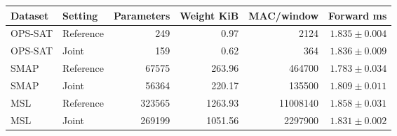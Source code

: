 \begin{tabular}{@{}llrrrr@{}}
\toprule
Dataset & Setting & Parameters & Weight KiB & MAC/window & Forward ms \\
\midrule
\acs{OPS-SAT} & Reference & \num{249} & \num{0.97} & \num{2124} & \(\num{1.835}\pm\num{0.004}\) \\
\acs{OPS-SAT} & Joint & \num{159} & \num{0.62} & \num{364} & \(\num{1.836}\pm\num{0.009}\) \\
\addlinespace
\acs{SMAP} & Reference & \num{67575} & \num{263.96} & \num{464700} & \(\num{1.783}\pm\num{0.034}\) \\
\acs{SMAP} & Joint & \num{56364} & \num{220.17} & \num{135500} & \(\num{1.809}\pm\num{0.011}\) \\
\addlinespace
\acs{MSL} & Reference & \num{323565} & \num{1263.93} & \num{11008140} & \(\num{1.858}\pm\num{0.031}\) \\
\acs{MSL} & Joint & \num{269199} & \num{1051.56} & \num{2297900} & \(\num{1.831}\pm\num{0.002}\) \\
\bottomrule
\end{tabular}
